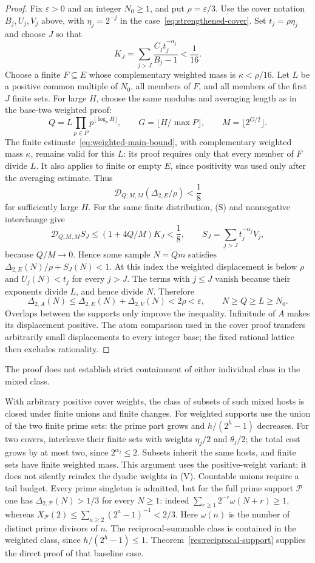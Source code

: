 \documentclass[11pt]{article}
\begin{document}
\begin{proof}
Fix $\varepsilon>0$ and an integer $N_0\ge1$, and put $\rho=\varepsilon/3$.
Use the cover notation $B_j,U_j,V_j$ above, with $\eta_j=2^{-j}$ in
the case~\eqref{eq:strengthened-cover}.  Set $t_j=\rho\eta_j$ and choose
$J$ so that
\[
 K_J=\sum_{j>J}\frac{C_jt_j^{-\alpha_j}}{B_j-1}<\frac1{16}.
\]
Choose a finite $F\subseteq E$ whose complementary weighted mass is
$\kappa<\rho/16$.  Let $L$ be a positive common multiple of $N_0$, all
members of $F$, and all members of the first $J$ finite sets.
For large $H$, choose the same modulus and averaging length as in the base-two weighted proof:
\[
 Q=L\prod_{p\in P}p^{\lfloor\log_pH\rfloor},\qquad
 G=\lfloor H/\max P\rfloor,\qquad M=\lfloor2^{G/2}\rfloor.
\]
The finite estimate~\eqref{eq:weighted-main-bound}, with complementary
weighted mass $\kappa$, remains valid for this $L$: its proof requires
only that every member of $F$ divide $L$.  It also applies to finite or empty $E$, since positivity was
used only after the averaging estimate.  Thus
\[
 \mathscr D_{Q;M,M}(\Delta_{2,E}/\rho)<\frac18
\]
for sufficiently large $H$.  For the same finite distribution, (S) and
nonnegative interchange give
\[
 \mathscr D_{Q;M,M}S_J\le(1+4Q/M)K_J<\frac18,
 \qquad S_J=\sum_{j>J}t_j^{-\alpha_j}V_j,
\]
because $Q/M\to0$.  Hence some sample $N=Qm$ satisfies
$\Delta_{2,E}(N)/\rho+S_J(N)<1$.  At this index the weighted displacement is below $\rho$ and
$U_j(N)<t_j$ for every $j>J$.  The terms with $j\le J$ vanish because
their exponents divide $L$, and hence divide $N$.  Therefore
\[
 \Delta_{2,A}(N)\le\Delta_{2,E}(N)+\Delta_{2,V}(N)<2\rho<\varepsilon,
 \qquad N\ge Q\ge L\ge N_0.
\]
Overlaps between the supports only improve the inequality.  Infinitude of
$A$ makes its displacement positive.  The atom comparison used in the cover
proof transfers arbitrarily small displacements to every integer base;
the fixed rational lattice then excludes rationality.
\end{proof}

The proof does not establish strict containment of either individual
class in the mixed class.

With arbitrary positive cover weights, the class of subsets of such mixed
hosts is closed under finite unions and finite changes.  For weighted
supports use the union of the two finite prime sets: the prime part grows
and $h/(2^h-1)$ decreases.  For two covers, interleave their finite sets with
weights $\eta_j/2$ and $\theta_j/2$; the total cost grows by at most two,
since $2^{\alpha_j}\le2$.  Subsets inherit the same hosts, and finite sets
have finite weighted mass.  This argument uses the positive-weight variant;
it does not silently reindex the dyadic weights in (V).
Countable unions require a tail budget.  Every prime singleton is admitted,
but for the full prime support $\mathcal P$ one has
$\Delta_{2,\mathcal P}(N)>1/3$ for every $N\ge1$: indeed
$\sum_{r\ge1}2^{-r}\omega(N+r)\ge1$, whereas
$X_{\mathcal P}(2)\le\sum_{a\ge2}(2^a-1)^{-1}<2/3$.
Here $\omega(n)$ is the number of distinct prime divisors of $n$.
The reciprocal-summable class is contained in the weighted class, since
$h/(2^h-1)\le1$.  Theorem~\ref{res:reciprocal-support} supplies the direct
proof of that baseline case.
\end{document}
